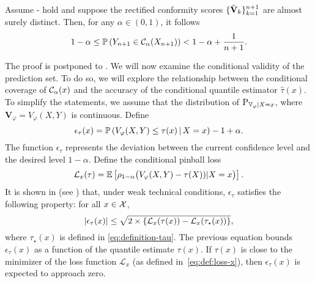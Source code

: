   \begin{theorem}\label{thm:coverage:marginal}
    Assume - hold and suppose the rectified conformity scores $\{\tilde{\mathbf{V}}_{k}\}_{k=1}^{n+1}$ are almost surely distinct.
    Then, for any $\alpha\in(0,1)$, it follows
    \begin{equation*}
      1 - \alpha
      \le \mathbb{P}\left({Y_{n+1} \in \mathcal{C}_{\alpha}(X_{n+1})}\right)
      < 1 - \alpha + \frac{1}{n+1}.
    \end{equation*}
  \end{theorem}
  The proof is postponed to .
  We will now examine the conditional validity of the prediction set.  To do so, we will explore the relationship between the conditional coverage of $\mathcal{C}_{\alpha}(x)$ and the accuracy of the conditional quantile estimator $\widehat{\tau}(x)$. To simplify the statements, we assume that the distribution of $\textup{P}_{\mathbb{V}_\varphi|X=x}$, where $\mathbf{V}_\varphi= V_\varphi(X,Y)$ is continuous. Define
  \begin{equation}\label{eq:def:epsilon-tau}
    \epsilon_{\tau}(x)
    = \mathbb{P}\left({V_\varphi(X,Y)\le \tau(x) \,\vert\, X=x}\right) - 1  + \alpha.
  \end{equation}
  The function $\epsilon_{\tau}$ represents the deviation between the current confidence level and the desired level $1-\alpha$.
  Define the conditional pinball loss 
  \begin{equation}
  \label{eq:def:loss-x}
    \mathcal{L}_x(\tau) =  \mathbb{E}\left[{\rho_{1-\alpha}\big({V_\varphi(X,Y) - \tau(X))|X=x}\big)}\right].
  \end{equation}
  It is shown in  (see  ) that, under weak technical conditions, $\epsilon_{\tau}$ satisfies the following property: for all $x\in\mathcal{X}$,  
  \begin{equation*}
    \left\lvert{\epsilon_{\tau}(x)}\right\rvert
    \le \sqrt{ 2 \times \left\{{ \mathcal{L}_{x}(\tau(x)) - \mathcal{L}_{x}(\tau_\star(x)) }\right\} },
  \end{equation*}
  where $\tau_\star(x)$ is defined in \eqref{eq:definition-tau}. The previous equation bounds \(\epsilon_{\tau}(x)\) as a function of the quantile estimate \(\tau(x)\). If \(\tau(x)\) is close to the minimizer of the loss function \(\mathcal{L}_{x}\) (as defined in~\eqref{eq:def:loss-x}), then \(\epsilon_{\tau}(x)\) is expected to approach zero.
  
